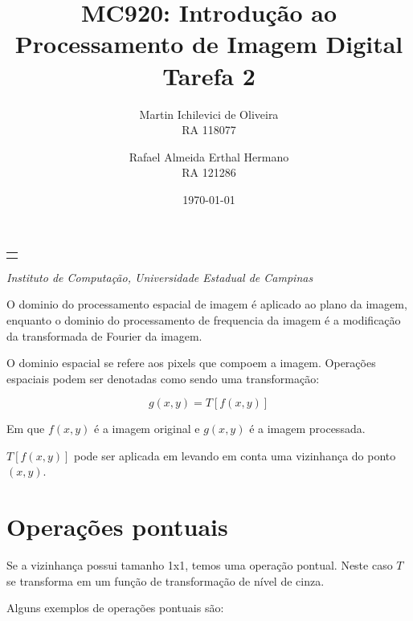 \documentclass[10pt,a4paper]{article}
\makeatletter
\let\@institution\empty
\def\institution#1{\def\@institution{#1}}
\renewcommand{\maketitle}{
    \begin{center}
        {\Large\bfseries\@title\par\medskip}
        {\large
            \begin{tabular}[t]{c}%
                \@author
        \end{tabular}\par\medskip}
        {\itshape\@institution\par}
        {\itshape\@date\par}
\end{center}}
\makeatother
\begin{document}

\title{MC920: Introdução ao Processamento de Imagem Digital\\Tarefa 2}
\author{
    \begin{minipage}{6cm}
        \centering
        Martin Ichilevici de Oliveira\\
        RA 118077
    \end{minipage}
    \and
    \begin{minipage}{6cm}
        \centering
        Rafael Almeida Erthal Hermano\\
        RA 121286
    \end{minipage}
}
\institution{Instituto de Computação, Universidade Estadual de Campinas}
\date{\today}

\maketitle


O dominio do processamento espacial de imagem é aplicado ao plano da imagem, enquanto o dominio do processamento de frequencia da imagem é a modificação da transformada de Fourier da imagem.

O dominio espacial se refere aos pixels que compoem a imagem. Operações espaciais podem ser denotadas como sendo uma transformação:

\[g(x,y) = T[f(x,y)]\]

Em que $f(x,y)$ é a imagem original e $g(x,y)$ é a imagem processada.

$T[f(x,y)]$ pode ser aplicada em levando em conta uma vizinhança do ponto $(x,y)$.

\section{Operações pontuais}

Se a vizinhança possui tamanho 1x1, temos uma operação pontual. Neste caso $T$ se transforma em um função de transformação de nível de cinza.

Alguns exemplos de operações pontuais são:
\end{document}
